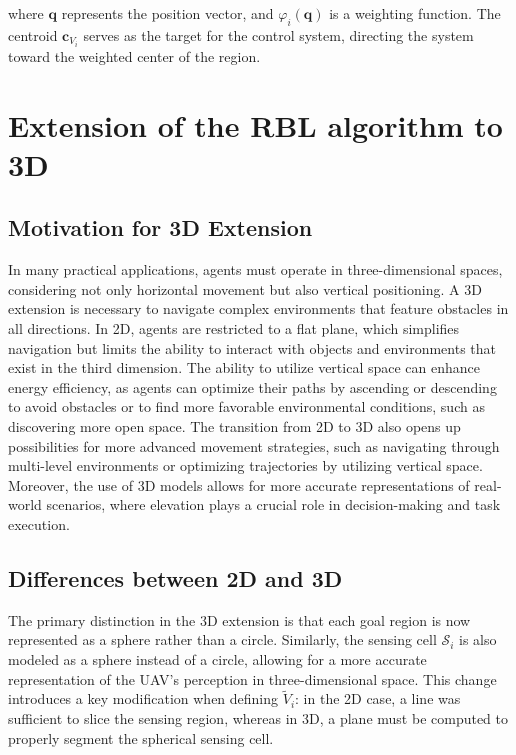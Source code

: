         where \( \mathbf{q} \) represents the position vector, and \( \varphi_i(\mathbf{q}) \) is a weighting function. 
        The centroid \( \mathbf{c}_{V_i} \) serves as the target for the control system, directing the system toward the weighted center of the region.
    
\section{Extension of the RBL algorithm to 3D}
    \subsection{Motivation for 3D Extension}
        In many practical applications, agents must operate in three-dimensional spaces, considering not only horizontal movement but also vertical positioning.
        A 3D extension is necessary to navigate complex environments that feature obstacles in all directions.
        In 2D, agents are restricted to a flat plane, which simplifies navigation but limits the ability to interact with objects and environments that exist in the third dimension.
        The ability to utilize vertical space can enhance energy efficiency, as agents can optimize their paths by ascending or descending to avoid obstacles or to find more favorable environmental conditions, such as discovering more open space.
        The transition from 2D to 3D also opens up possibilities for more advanced movement strategies, such as navigating through multi-level environments or optimizing trajectories by utilizing vertical space.  
        Moreover, the use of 3D models allows for more accurate representations of real-world scenarios, where elevation plays a crucial role in decision-making and task execution.


    \subsection{Differences between 2D and 3D}
        The primary distinction in the 3D extension is that each goal region is now represented as a sphere rather than a circle.  
        Similarly, the sensing cell $\mathcal{S}_i$ is also modeled as a sphere instead of a circle, allowing for a more accurate representation of the \ac{UAV}'s perception in three-dimensional space.  
        This change introduces a key modification when defining $\tilde{V}_i$: in the 2D case, a line was sufficient to slice the sensing region, whereas in 3D, a plane must be computed to properly segment the spherical sensing cell. 
        
